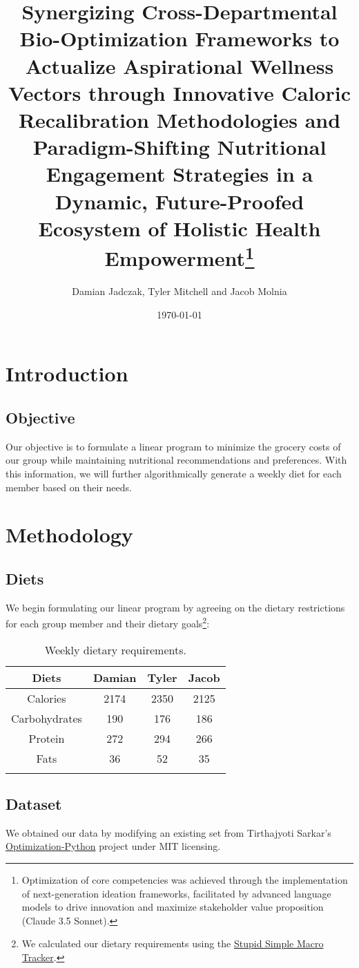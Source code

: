 \documentclass[12pt, english]{report}
\title{Synergizing Cross-Departmental Bio-Optimization Frameworks to Actualize Aspirational Wellness Vectors through Innovative Caloric Recalibration Methodologies and Paradigm-Shifting Nutritional Engagement Strategies in a Dynamic, Future-Proofed Ecosystem of Holistic Health Empowerment\footnote{Optimization of core competencies was achieved through the implementation of next-generation ideation frameworks, facilitated by advanced language models to drive innovation and maximize stakeholder value proposition (Claude 3.5 Sonnet).}}
\author{Damian Jadczak, Tyler Mitchell and Jacob Molnia}
\date\today
\begin{document}
\maketitle
\tableofcontents
\pagebreak
\chapter{Introduction}
\vspace*{-1in}
\section{Objective}
Our objective is to formulate a linear program to minimize the grocery costs of our group while maintaining nutritional recommendations and preferences. With this information, we will further algorithmically generate a weekly diet for each member based on their needs.
\chapter{Methodology}
\vspace*{-1in}
\section{Diets}
We begin formulating our linear program by agreeing on the dietary restrictions for each group member and their dietary goals\footnote{We calculated our dietary requirements using the \href{https://apps.apple.com/us/app/stupid-simple-macro-tracker/id1210995590}{Stupid Simple Macro Tracker}.}:
\begin{table}[H]
    \centering
    \caption[short]{Weekly dietary requirements.}
    \begin{tabular}{cccc}
        \toprule
        Diets & Damian & Tyler & Jacob\\ 
        \midrule
        Calories &2174 &2350 & 2125 \\
        Carbohydrates &190 &176 & 186 \\
        Protein & 272 &294 & 266 \\ 
        Fats &36 &52 & 35\\ 
    \bottomrule
    \label{tab:diet}
    \end{tabular}
\end{table}
\section{Dataset}
We obtained our data by modifying an existing set from Tirthajyoti Sarkar's \href{https://github.com/tirthajyoti/Optimization-Python/blob/master/Data/diet.xls}{Optimization-Python} project under MIT licensing.
\pagebreak
\printbibliography
\end{document}
